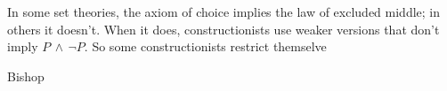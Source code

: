 In some set theories, the axiom of choice implies
the law of excluded middle; in others it doesn't.
When it does, constructionists use weaker versions
that don't imply $P \, \wedge \, \lnot P$.
So some constructionists restrict themselve

\label{sec:Measure_theory}

Bishop~\cite{bishop1967foundations,bishop1972constructive,bishop1985constructive}

 
